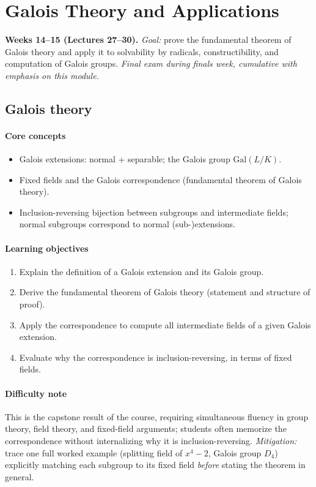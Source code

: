 \documentclass{article}
\begin{document}
\section{Galois Theory and Applications}
\textbf{Weeks 14--15 (Lectures 27--30).} \emph{Goal:} prove the fundamental theorem of Galois theory and apply it to solvability by radicals, constructibility, and computation of Galois groups. \emph{Final exam during finals week, cumulative with emphasis on this module.}

\subsection{Galois theory}
\paragraph{Core concepts}
\begin{itemize}[nosep]
  \item Galois extensions: normal + separable; the Galois group $\mathrm{Gal}(L/K)$.
  \item Fixed fields and the Galois correspondence (fundamental theorem of Galois theory).
  \item Inclusion-reversing bijection between subgroups and intermediate fields; normal subgroups correspond to normal (sub-)extensions.
\end{itemize}
\paragraph{Learning objectives}
\begin{enumerate}[nosep]
  \item Explain the definition of a Galois extension and its Galois group.
  \item Derive the fundamental theorem of Galois theory (statement and structure of proof).
  \item Apply the correspondence to compute all intermediate fields of a given Galois extension.
  \item Evaluate why the correspondence is inclusion-reversing, in terms of fixed fields.
\end{enumerate}
\paragraph{Difficulty note}
This is the capstone result of the course, requiring simultaneous fluency in group theory, field theory, and fixed-field arguments; students often memorize the correspondence without internalizing why it is inclusion-reversing. \emph{Mitigation:} trace one full worked example (splitting field of $x^4-2$, Galois group $D_4$) explicitly matching each subgroup to its fixed field \emph{before} stating the theorem in general.
\end{document}
